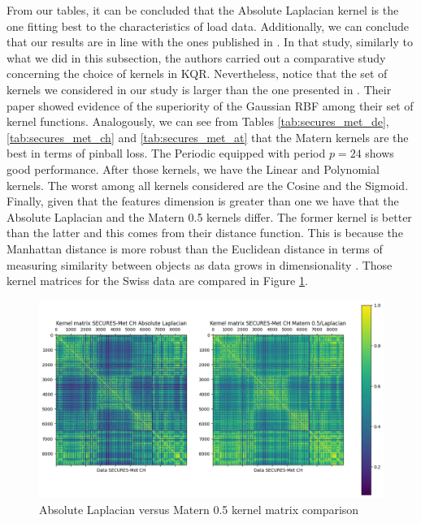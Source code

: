 From our tables, it can be concluded that the Absolute Laplacian kernel is the one fitting best to the characteristics of load data.
Additionally, we can conclude that our results are in line with the ones published in \cite{he2017short}. In that study, similarly to what we did in this subsection, the authors carried out a comparative study concerning the choice of kernels in KQR. Nevertheless, notice that the set of kernels we considered in our study is larger than the one presented in \cite{he2017short}.
Their paper showed evidence of the superiority of the Gaussian RBF among their set of kernel functions. Analogously, we can see from Tables \ref{tab:secures_met_de}, \ref{tab:secures_met_ch} and \ref{tab:secures_met_at} that the Matern kernels are the best in terms of pinball loss.
The Periodic equipped with period $p=24$ shows good performance. 
After those kernels, we have the Linear and Polynomial kernels.
The worst among all kernels considered are the Cosine and the Sigmoid.
Finally, given that the features dimension is greater than one we have that the Absolute Laplacian and the Matern 0.5 kernels differ. The former kernel is better than the latter and this comes from their distance function. This is because the Manhattan distance is more robust than the Euclidean distance in terms of measuring similarity between objects as data grows in dimensionality \cite{Aggarwal2001}. %
Those kernel matrices for the Swiss data are compared in Figure \ref{fig:k_matrix_laplacian_comp}.

\begin{figure}[!ht]
    \includegraphics[width=\textwidth]{images/k_matrix_laplacian_comp.png}
    \caption{Absolute Laplacian versus Matern 0.5 kernel matrix comparison}
    \label{fig:k_matrix_laplacian_comp}
\end{figure}

